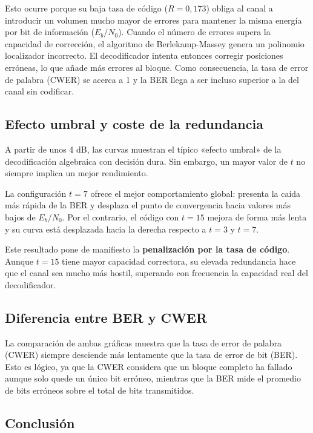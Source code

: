 Esto ocurre porque su baja tasa de código ($R = 0,173$) obliga al canal a introducir un volumen mucho mayor de errores para mantener la misma energía por bit de información ($E_b/N_0$). Cuando el número de errores supera la capacidad de corrección, el algoritmo de Berlekamp-Massey genera un polinomio localizador incorrecto. El decodificador intenta entonces corregir posiciones erróneas, lo que añade más errores al bloque. Como consecuencia, la tasa de error de palabra (CWER) se acerca a 1 y la BER llega a ser incluso superior a la del canal sin codificar.

\subsection{Efecto umbral y coste de la redundancia}

A partir de unos 4 dB, las curvas muestran el típico «efecto umbral» de la decodificación algebraica con decisión dura. Sin embargo, un mayor valor de $t$ no siempre implica un mejor rendimiento.

La configuración $t=7$ ofrece el mejor comportamiento global: presenta la caída más rápida de la BER y desplaza el punto de convergencia hacia valores más bajos de $E_b/N_0$. Por el contrario, el código con $t=15$ mejora de forma más lenta y su curva está desplazada hacia la derecha respecto a $t=3$ y $t=7$.

Este resultado pone de manifiesto la \textbf{penalización por la tasa de código}. Aunque $t=15$ tiene mayor capacidad correctora, su elevada redundancia hace que el canal sea mucho más hostil, superando con frecuencia la capacidad real del decodificador.

\subsection{Diferencia entre BER y CWER}

La comparación de ambas gráficas muestra que la tasa de error de palabra (CWER) siempre desciende más lentamente que la tasa de error de bit (BER). Esto es lógico, ya que la CWER considera que un bloque completo ha fallado aunque solo quede un único bit erróneo, mientras que la BER mide el promedio de bits erróneos sobre el total de bits transmitidos.

\subsection{Conclusión}

